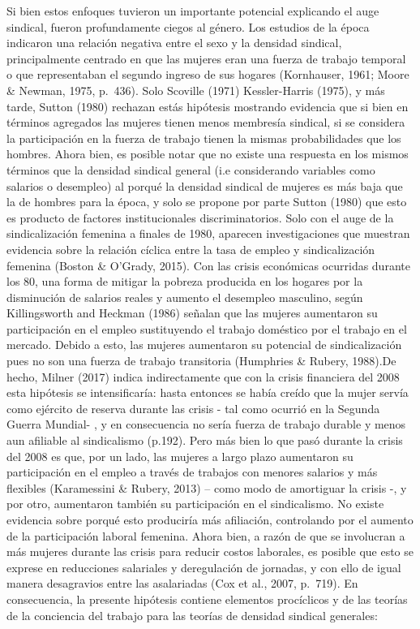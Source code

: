 \documentclass[
]{book}
\begin{document}
Si bien estos enfoques tuvieron un importante potencial explicando el auge sindical, fueron profundamente ciegos al género. Los estudios de la época indicaron una relación negativa entre el sexo y la densidad sindical, principalmente centrado en que las mujeres eran una fuerza de trabajo temporal o que representaban el segundo ingreso de sus hogares (Kornhauser, 1961; Moore \& Newman, 1975, p.~436). Solo Scoville (1971) Kessler-Harris (1975), y más tarde, Sutton (1980) rechazan estás hipótesis mostrando evidencia que si bien en términos agregados las mujeres tienen menos membresía sindical, si se considera la participación en la fuerza de trabajo tienen la mismas probabilidades que los hombres. Ahora bien, es posible notar que no existe una respuesta en los mismos términos que la densidad sindical general (i.e considerando variables como salarios o desempleo) al porqué la densidad sindical de mujeres es más baja que la de hombres para la época, y solo se propone por parte Sutton (1980) que esto es producto de factores institucionales discriminatorios.
Solo con el auge de la sindicalización femenina a finales de 1980, aparecen investigaciones que muestran evidencia sobre la relación cíclica entre la tasa de empleo y sindicalización femenina (Boston \& O'Grady, 2015). Con las crisis económicas ocurridas durante los 80, una forma de mitigar la pobreza producida en los hogares por la disminución de salarios reales y aumento el desempleo masculino, según Killingsworth and Heckman (1986) señalan que las mujeres aumentaron su participación en el empleo sustituyendo el trabajo doméstico por el trabajo en el mercado. Debido a esto, las mujeres aumentaron su potencial de sindicalización pues no son una fuerza de trabajo transitoria (Humphries \& Rubery, 1988).De hecho, Milner (2017) indica indirectamente que con la crisis financiera del 2008 esta hipótesis se intensificaría: hasta entonces se había creído que la mujer servía como ejército de reserva durante las crisis - tal como ocurrió en la Segunda Guerra Mundial- , y en consecuencia no sería fuerza de trabajo durable y menos aun afiliable al sindicalismo (p.192). Pero más bien lo que pasó durante la crisis del 2008 es que, por un lado, las mujeres a largo plazo aumentaron su participación en el empleo a través de trabajos con menores salarios y más flexibles (Karamessini \& Rubery, 2013) -- como modo de amortiguar la crisis -, y por otro, aumentaron también su participación en el sindicalismo. No existe evidencia sobre porqué esto produciría más afiliación, controlando por el aumento de la participación laboral femenina. Ahora bien, a razón de que se involucran a más mujeres durante las crisis para reducir costos laborales, es posible que esto se exprese en reducciones salariales y deregulación de jornadas, y con ello de igual manera desagravios entre las asalariadas (Cox et al., 2007, p.~719). En consecuencia, la presente hipótesis contiene elementos procíclicos y de las teorías de la conciencia del trabajo para las teorías de densidad sindical generales:
\end{document}
